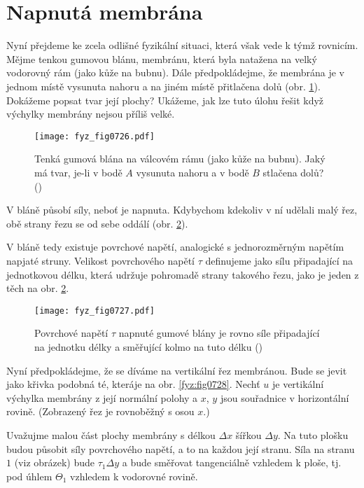   \section{Napnutá membrána}\label{fyz:IIchapXIIsecIII}
    Nyní přejdeme ke zcela odlišné fyzikální situaci, která však vede k týmž rovnicím. Mějme ten­kou
    gumovou blánu, membránu, která byla natažena na velký vodorovný rám (jako kůže na bub­nu). Dále
    předpokládejme, že membrána je v jednom místě vysunuta nahoru a na jiném místě přitlačena dolů
    (obr. \ref{fyz:fig0726}). Dokážeme popsat tvar její plochy? Ukážeme, jak lze tuto úlohu řešit
    když výchylky membrány nejsou příliš velké.

    \begin{figure}[ht!] %
      \centering
      \texttt{[image: fyz\_fig0726.pdf]}
      \caption{Tenká gumová blána na válcovém rámu (jako kůže na bubnu). Jaký má tvar, je-li v bodě
        \(A\) vysunuta nahoru a v bodě \(B\) stlačena dolů? (\cite[s.~211]{Feynman02})}
      \label{fyz:fig0726}
    \end{figure}

    V bláně působí síly, neboť je napnuta. Kdybychom kdekoliv v ní udělali malý řez, obě strany 
    řezu se od sebe oddálí (obr. \ref{fyz:fig0727}).

    V bláně tedy existuje povrchové napětí, analogické s jednorozměrným napětím napjaté struny.
    Velikost povrchového napětí \(\tau\) definujeme jako sílu připadající na jednotkovou délku,
    která udržuje pohromadě strany takového řezu, jako je jeden z těch na obr. \ref{fyz:fig0727}.

    \begin{figure}[ht!] %
      \centering
      \texttt{[image: fyz\_fig0727.pdf]}
      \caption{Povrchové napětí \(\tau\) napnuté gumové blány je rovno síle připadající na jednotku
        délky a směřující kolmo na tuto délku (\cite[s.~211]{Feynman02})}
      \label{fyz:fig0727}
    \end{figure}

    Nyní předpokládejme, že se díváme na vertikální řez membránou. Bude se jevit jako křivka podobná
    té, kteráje na obr. \ref{fyz:fig0728}. Nechť \(u\) je vertikální výchylka membrány z její
    normální polohy a \(x\), \(y\) jsou souřadnice v horizontální rovině. (Zobrazený řez je
    rovnoběžný s osou \(x\).)

    Uvažujme malou část plochy membrány s délkou \(\Delta x\) šířkou \(\Delta y\). Na tuto plošku
    budou působit síly povrchového napětí, a to na každou její stranu. Síla na stranu \(1\) (viz
    obrázek) bude \(\tau_1\Delta y\) a bude směřovat tangenciálně vzhledem k ploše, tj. pod úhlem
    \(\Theta_1\) vzhledem k vodorovné rovině.

